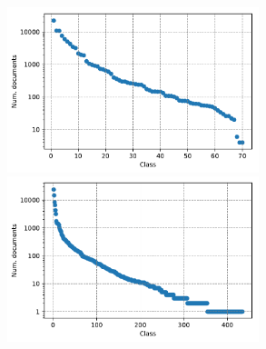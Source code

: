 \begin{frame}
  \centering
  \includegraphics[width=0.55\textwidth]{img/classDist-icdo3-site.pdf}
  \includegraphics[width=0.55\textwidth]{img/classDist-icdo3-type.pdf}
\end{frame}

